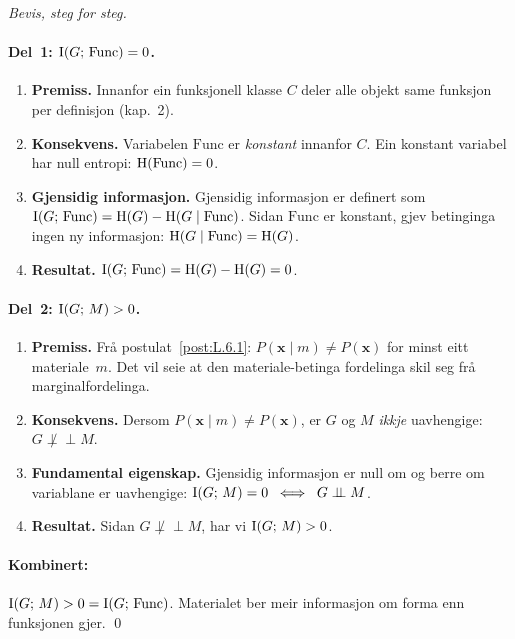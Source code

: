 \begin{proof}[Bevis, steg for steg]

\paragraph{Del~1: $\operatorname{I}(G;\, \mathrm{Func}) = 0$.}

\begin{enumerate}
  \item \textbf{Premiss.}\;
    Innanfor ein funksjonell klasse $C$ deler alle objekt same
    funksjon per definisjon (kap.~2).
  \item \textbf{Konsekvens.}\;
    Variabelen $\mathrm{Func}$ er \emph{konstant} innanfor $C$.
    Ein konstant variabel har null entropi:
    $\operatorname{H}(\mathrm{Func}) = 0$.
  \item \textbf{Gjensidig informasjon.}\;
    Gjensidig informasjon er definert som
    $\operatorname{I}(G;\, \mathrm{Func}) = \operatorname{H}(G) -
    \operatorname{H}(G \mid \mathrm{Func})$.
    Sidan $\mathrm{Func}$ er konstant, gjev betinginga ingen ny
    informasjon:
    $\operatorname{H}(G \mid \mathrm{Func}) = \operatorname{H}(G)$.
  \item \textbf{Resultat.}\;
    $\operatorname{I}(G;\, \mathrm{Func}) = \operatorname{H}(G) - \operatorname{H}(G) = 0$.
\end{enumerate}

\paragraph{Del~2: $\operatorname{I}(G;\, M) > 0$.}

\begin{enumerate}
  \item \textbf{Premiss.}\;
    Frå postulat~\ref{post:L.6.1}:
    $P(\bm{x} \mid m) \neq P(\bm{x})$ for minst eitt
    materiale~$m$. Det vil seie at den materiale-betinga
    fordelinga skil seg frå marginalfordelinga.
  \item \textbf{Konsekvens.}\;
    Dersom $P(\bm{x} \mid m) \neq P(\bm{x})$, er $G$ og $M$
    \emph{ikkje} uavhengige: $G \not\perp\!\!\!\perp M$.
  \item \textbf{Fundamental eigenskap.}\;
    Gjensidig informasjon er null om og berre om variablane er
    uavhengige:
    $\operatorname{I}(G;\, M) = 0 \;\iff\; G \perp\!\!\!\perp M$.
  \item \textbf{Resultat.}\;
    Sidan $G \not\perp\!\!\!\perp M$, har vi $\operatorname{I}(G;\, M) > 0$.
\end{enumerate}

\paragraph{Kombinert:}
$\operatorname{I}(G;\, M) > 0 = \operatorname{I}(G;\, \mathrm{Func})$. Materialet ber meir
informasjon om forma enn funksjonen gjer. \qed
\end{proof}

